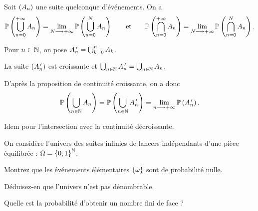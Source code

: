 \begin{prop}
Soit \(\left(A_n\right)\) une suite quelconque d'événements. On a \[\mathbb{P}\left(\bigcup_{n=0}^{+\infty}A_n\right)=\lim_{N\longrightarrow+\infty}\mathbb{P}\left(\bigcup_{n=0}^NA_n\right)\qquad\text{et}\qquad\mathbb{P}\left(\bigcap_{n=0}^{+\infty}A_n\right)=\lim_{N\longrightarrow+\infty}\mathbb{P}\left(\bigcap_{n=0}^NA_n\right).\]
\end{prop}

\begin{dem}
Pour \(n\in\mathbb{N}\), on pose \(A_n^{\,\prime}=\bigcup_{k=0}^nA_k\).

La suite \(\left(A_n^{\,\prime}\right)\) est croissante et \(\bigcup_{n\in\mathbb{N}}A_n^{\,\prime}=\bigcup_{n\in\mathbb{N}}A_n\).

D'après la proposition de continuité croissante, on a donc \[\mathbb{P}\left(\bigcup_{n\in\mathbb{N}}A_n\right)=\mathbb{P}\left(\bigcup_{n\in\mathbb{N}}A_n^{\,\prime}\right)=\lim_{n\longrightarrow+\infty}\mathbb{P}\left(A_n^{\,\prime}\right).\]

Idem pour l'intersection avec la continuité décroissante.
\end{dem}

\begin{exo}
On considère l'univers des suites infinies de lancers indépendants d'une pièce équilibrée : \(\Omega=\left\lbrace0,1\right\rbrace^{\mathbb{N}}\).

Montrez que les événements élémentaires \(\left\lbrace\omega\right\rbrace\) sont de probabilité nulle.

Déduisez-en que l'univers n'est pas dénombrable.

Quelle est la probabilité d'obtenir un nombre fini de face ?
\end{exo}

